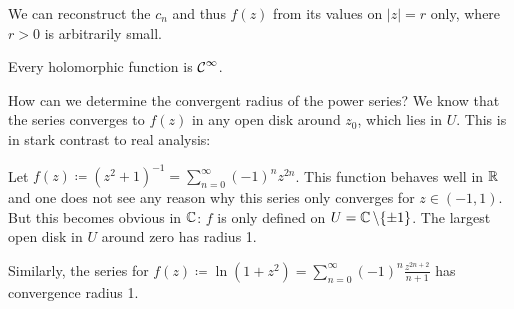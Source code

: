 \documentclass[a4paper,english]{article}
\begin{document}
\begin{remark}
    We can reconstruct the $c_n$ and thus $f(z)$ from its values on $| z | = r$ only, where $r > 0$ is arbitrarily small.
\end{remark}

\begin{cor} \label{cor:goursat}
    Every holomorphic function is $\operatorname{\mathcal{C}}^{\infty}$.
\end{cor}

How can we determine the convergent radius of the power series?
We know that the series converges to $f(z)$ in any open disk around $z_0$, which lies in $U$.
This is in stark contrast to real analysis:
\begin{example}
    Let $f(z) \coloneqq (z^2 + 1)^{-1} = \sum_{n = 0}^{\infty} (-1)^n z^{2n}$.
    This function behaves well in $\operatorname{\mathbb{R}}$ and one does not see any reason why this series only converges for $z \in (-1, 1)$.
    But this becomes obvious in $\operatorname{\mathbb{C}}$: $f$ is only defined on $U = \operatorname{\mathbb{C}} \setminus \{ \pm 1\}$.
    The largest open disk in $U$ around zero has radius 1.
    
    Similarly, the series for $f(z) \coloneqq \ln(1 + z^2) = \sum_{n = 0}^{\infty} (-1)^n \frac{z^{2n + 2}}{n + 1}$ has convergence radius 1.
\end{example}
\end{document}
